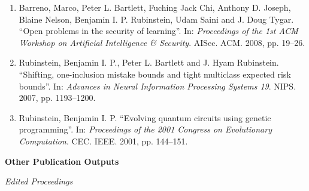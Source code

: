 \documentclass[a4paper,12pt]{article}
\begin{document}
\begin{enumerate}
\item Barreno, Marco, Peter L. Bartlett, Fuching Jack Chi, Anthony D. Joseph, Blaine Nelson, Benjamin I. P. Rubinstein, Udam Saini and J. Doug Tygar.
``Open problems in the security of learning''.
In: 
\emph{Proceedings of the 1st ACM Workshop on Artificial Intelligence \& Security}.
AISec.
ACM.
2008, pp. 19--26.

\item Rubinstein, Benjamin I. P., Peter L. Bartlett and J. Hyam Rubinstein.
``Shifting, one-inclusion mistake bounds and tight multiclass expected risk bounds''.
In: 
\emph{Advances in Neural Information Processing Systems 19}.
NIPS.
2007, pp. 1193--1200.

\item Rubinstein, Benjamin I. P.
``Evolving quantum circuits using genetic programming''.
In: 
\emph{Proceedings of the 2001 Congress on Evolutionary Computation}.
CEC.
IEEE.
2001, pp. 144--151.


\setcounter{list}{\value{enumi}}
\end{enumerate}

\noindent\textbf{Other Publication Outputs}

\noindent\textit{Edited Proceedings}
\end{document}
